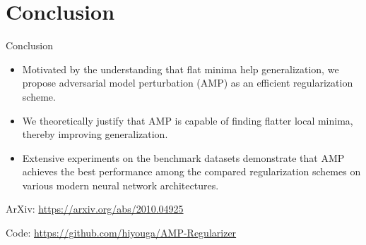 \section{Conclusion}


\begin{frame}{Conclusion}

\begin{itemize}
\item Motivated by the understanding that flat minima help generalization, we propose adversarial model perturbation (AMP) as an efficient regularization scheme.
\item We theoretically justify that AMP is capable of finding flatter local minima, thereby improving generalization.
\item Extensive experiments on the benchmark datasets demonstrate that AMP achieves the best performance among the compared regularization schemes on various modern neural network architectures.
\end{itemize}

ArXiv: \url{https://arxiv.org/abs/2010.04925}

Code: \url{https://github.com/hiyouga/AMP-Regularizer}

\end{frame}
